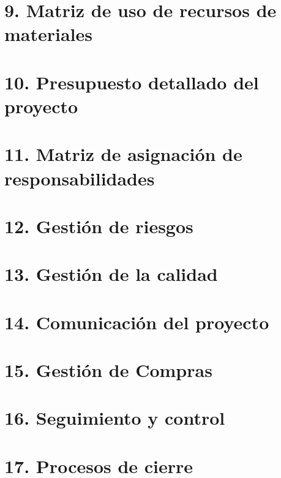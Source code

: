 \documentclass[12pt]{charter}
\begin{document}
\section{9. Matriz de uso de recursos de materiales}
\section{10. Presupuesto detallado del proyecto}
\section{11. Matriz de asignación de responsabilidades}
\section{12. Gestión de riesgos}
\section{13. Gestión de la calidad}
\section{14. Comunicación del proyecto}
\section{15. Gestión de Compras}
\section{16. Seguimiento y control}
\section{17. Procesos de cierre}    

%
\end{document}
